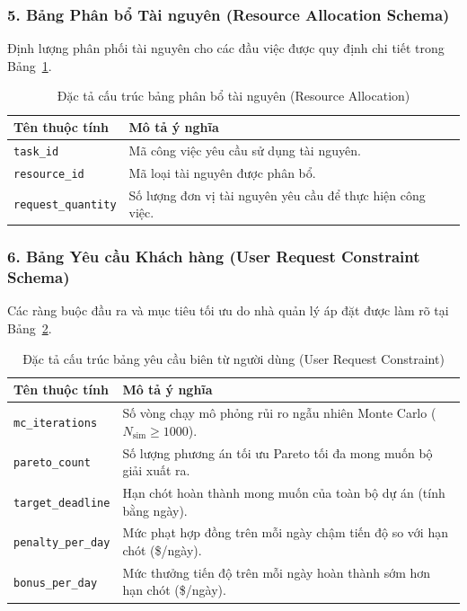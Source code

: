 \subsubsection{5. Bảng Phân bổ Tài nguyên (Resource Allocation Schema)}
Định lượng phân phối tài nguyên cho các đầu việc được quy định chi tiết trong Bảng~\ref{tab:resource_allocation_schema}.

\begin{table}[H]
\centering
\caption{Đặc tả cấu trúc bảng phân bổ tài nguyên (Resource Allocation)}
\label{tab:resource_allocation_schema}
\begin{tabular}{|p{4.5cm}|p{10.5cm}|}
\hline
\textbf{Tên thuộc tính} & \textbf{Mô tả ý nghĩa} \\ \hline
\texttt{task\_id} & Mã công việc yêu cầu sử dụng tài nguyên. \\ \hline
\texttt{resource\_id} & Mã loại tài nguyên được phân bổ. \\ \hline
\texttt{request\_quantity} & Số lượng đơn vị tài nguyên yêu cầu để thực hiện công việc. \\ \hline
\end{tabular}
\end{table}

\subsubsection{6. Bảng Yêu cầu Khách hàng (User Request Constraint Schema)}
Các ràng buộc đầu ra và mục tiêu tối ưu do nhà quản lý áp đặt được làm rõ tại Bảng~\ref{tab:user_request_schema}.

\begin{table}[H]
\centering
\caption{Đặc tả cấu trúc bảng yêu cầu biên từ người dùng (User Request Constraint)}
\label{tab:user_request_schema}
\begin{tabular}{|p{4.5cm}|p{10.5cm}|}
\hline
\textbf{Tên thuộc tính} & \textbf{Mô tả ý nghĩa} \\ \hline
\texttt{mc\_iterations} & Số vòng chạy mô phỏng rủi ro ngẫu nhiên Monte Carlo ($N_{\text{sim}} \ge 1000$). \\ \hline
\texttt{pareto\_count} & Số lượng phương án tối ưu Pareto tối đa mong muốn bộ giải xuất ra. \\ \hline
\texttt{target\_deadline} & Hạn chót hoàn thành mong muốn của toàn bộ dự án (tính bằng ngày). \\ \hline
\texttt{penalty\_per\_day} & Mức phạt hợp đồng trên mỗi ngày chậm tiến độ so với hạn chót (\$/ngày). \\ \hline
\texttt{bonus\_per\_day} & Mức thưởng tiến độ trên mỗi ngày hoàn thành sớm hơn hạn chót (\$/ngày). \\ \hline
\end{tabular}
\end{table}

